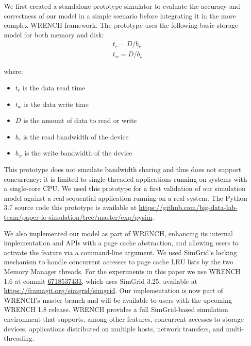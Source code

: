 \documentclass[conference]{IEEEtran}
\newcommand{\simgrid}{SimGrid\xspace}
\newcommand{\wrench}{WRENCH\xspace}
\begin{document}
            We first created a standalone prototype
            simulator to evaluate the accuracy and correctness of our
            model in a simple scenario before integrating it in the more complex
            \wrench framework.
            The prototype uses the following basic storage model for
            both memory and disk:
            \begin{align*}
                & t_{r} = D / b_r \\
                & t_{w} = D / b_w\
            \end{align*}

            where:
            \begin{itemize}
                \item $t_{r}$ is the data read time
                \item $t_{w}$ is the data write time
                \item $D$ is the amount of data to read or write
                \item $b_r$ is the read bandwidth of the device
                \item $b_w$ is the write bandwidth of the device
            \end{itemize}

            This prototype does not simulate  bandwidth sharing and thus does not support
            concurrency: it is limited to single-threaded applications running on systems
            with a single-core CPU. We used this prototype for a first validation of our simulation
            model against a real sequential application running on a real system.
            The Python 3.7 source code this prototype is available at
            \url{https://github.com/big-data-lab-team/paper-io-simulation/tree/master/exp/pysim}.

            We also implemented our model as part of \wrench, enhancing its
            internal implementation and APIs with a page cache abstraction,
            and allowing users to activate the feature via a command-line
            argument. We used SimGrid's locking mechanism to handle
            concurrent accesses to page cache LRU lists by the two Memory
            Manager threads. For the experiments in this paper we use
            \wrench 1.6 at commit
            \href{https://github.com/wrench-project/wrench/tree/67185374330d2c4bf274fce222c937e838df5b03}{6718537433},
            which uses \simgrid 3.25, available at
            \url{https://framagit.org/simgrid/simgrid}. Our implementation
            is now part of \wrench's master branch and will be available to
            users with the upcoming \wrench 1.8 release. \wrench provides a full \simgrid-based simulation 
            environment that supports, among other features, concurrent accesses to storage devices, 
            applications distributed on multiple hosts, network transfers, 
            and multi-threading. 
\end{document}
